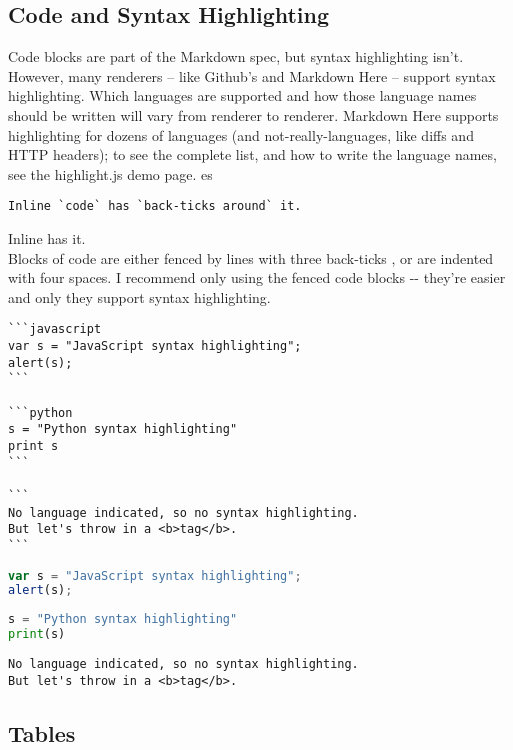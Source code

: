 \documentclass[a4paper, 11pt]{gfm}
\begin{document}
\subsection{Code and Syntax Highlighting}

Code blocks are part of the Markdown spec, but syntax highlighting isn't. However, many renderers -- like Github's and Markdown Here -- support syntax highlighting. Which languages are supported and how those language names should be written will vary from renderer to renderer. Markdown Here supports highlighting for dozens of languages (and not-really-languages, like diffs and HTTP headers); to see the complete list, and how to write the language names, see the highlight.js demo page.
es
\begin{lstlisting}
Inline `code` has `back-ticks around` it.
\end{lstlisting}

Inline  has  it. \\

Blocks of code are either fenced by lines with three back-ticks , or are indented with four spaces. I recommend only using the fenced code blocks -{-} they're easier and only they support syntax highlighting.

\begin{lstlisting}
```javascript
var s = "JavaScript syntax highlighting";
alert(s);
```
 
```python
s = "Python syntax highlighting"
print s
```
 
```
No language indicated, so no syntax highlighting. 
But let's throw in a <b>tag</b>.
```
\end{lstlisting}

\begin{lstlisting}[language=JavaScript]
var s = "JavaScript syntax highlighting";
alert(s);
\end{lstlisting}

\begin{lstlisting}[language=Python]
s = "Python syntax highlighting"
print(s)
\end{lstlisting}

\begin{lstlisting}
No language indicated, so no syntax highlighting. 
But let's throw in a <b>tag</b>.
\end{lstlisting}

\subsection{Tables}
\end{document}
